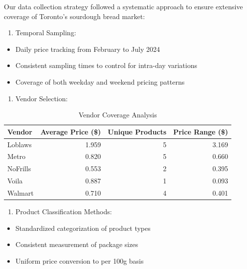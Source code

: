 \documentclass[
  letterpaper,
  DIV=11,
  numbers=noendperiod]{scrartcl}
\providecommand{\tightlist}{%
  \setlength{\itemsep}{0pt}\setlength{\parskip}{0pt}}\usepackage{longtable,booktabs,array}
\begin{document}
Our data collection strategy followed a systematic approach to ensure
extensive coverage of Toronto's sourdough bread market:

\begin{enumerate}
\def\labelenumi{\arabic{enumi}.}
\tightlist
\item
  Temporal Sampling:
\end{enumerate}

\begin{itemize}
\item
  Daily price tracking from February to July 2024
\item
  Consistent sampling times to control for intra-day variations
\item
  Coverage of both weekday and weekend pricing patterns
\end{itemize}

\begin{enumerate}
\def\labelenumi{\arabic{enumi}.}
\setcounter{enumi}{1}
\tightlist
\item
  Vendor Selection:
\end{enumerate}

\begin{longtable}[t]{lrrr}

\caption{\label{tbl-vendor-coverage}Vendor Coverage Analysis}

\tabularnewline

\toprule
Vendor & Average Price (\$) & Unique Products & Price Range (\$)\\
\midrule
Loblaws & 1.959 & 5 & 3.169\\
Metro & 0.820 & 5 & 0.660\\
NoFrills & 0.553 & 2 & 0.395\\
Voila & 0.887 & 1 & 0.093\\
Walmart & 0.710 & 4 & 0.401\\
\bottomrule

\end{longtable}

\begin{enumerate}
\def\labelenumi{\arabic{enumi}.}
\setcounter{enumi}{2}
\tightlist
\item
  Product Classification Methods:
\end{enumerate}

\begin{itemize}
\tightlist
\item
  Standardized categorization of product types
\item
  Consistent measurement of package sizes
\item
  Uniform price conversion to per 100g basis
\end{itemize}
\end{document}
